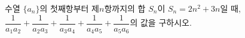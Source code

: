\hspace*{2mm}\begin{minipage}[t]{\dimexpr\linewidth-2mm\relax}\vspace{0pt}
수열 $\{a_n\}$의 첫째항부터 제$n$항까지의 합 $S_n$이 $S_n=2n^2+3n$일 때, $\dfrac{1}{a_1a_2}+\dfrac{1}{a_2a_3}+\dfrac{1}{a_3a_4}+\dfrac{1}{a_4a_5}+\dfrac{1}{a_5a_6}$의 값을 구하시오.\end{minipage}
